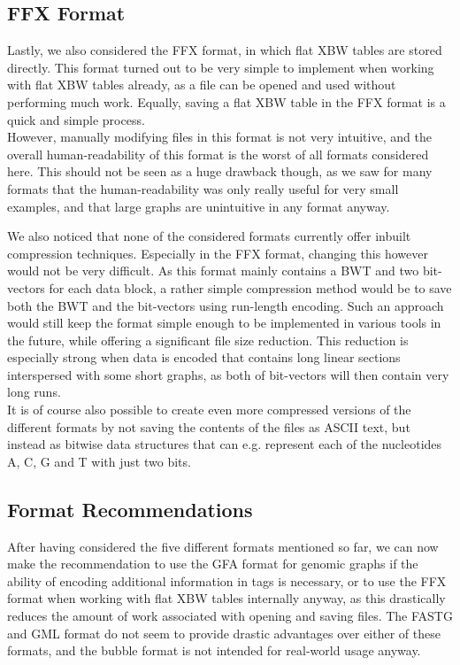 \documentclass[a4paper,12pt,twoside,BCOR=10mm]{scrbook}
\begin{document}
\subsection{FFX Format}

Lastly, we also considered the FFX format, in which flat XBW tables are stored directly. 
This format turned out to be very simple to implement when working with flat XBW tables already, 
as a file can be opened and used without performing much work. Equally, saving a flat XBW table 
in the FFX format is a quick and simple process. \\
However, manually modifying files in this format is not very intuitive, 
and the overall human-readability of this format is the worst of all formats considered here. 
This should not be seen as a huge drawback though, as we saw for many formats that the human-readability was 
only really useful for very small examples, and that large graphs are unintuitive in any format anyway.

We also noticed that none of the considered formats currently offer inbuilt compression techniques. 
Especially in the FFX format, changing this however would not be very difficult. 
As this format mainly contains a BWT and two bit-vectors for each data block, 
a rather simple compression method would be to save both the BWT and the bit-vectors 
using run-length encoding. 
Such an approach would still keep the format simple enough to be implemented in various 
tools in the future, while offering a significant file size reduction. 
This reduction is especially strong when data is encoded that contains long linear sections 
interspersed with some short graphs, as both of bit-vectors will then 
contain very long runs. \\
It is of course also possible to create even more compressed versions 
of the different formats by not saving the contents of the files as ASCII text, 
but instead as bitwise data structures that can e.g. represent each of the nucleotides A, C, G and T with 
just two bits.

\subsection{Format Recommendations}

After having considered the five different formats mentioned so far, 
we can now make the recommendation to use the GFA format for genomic graphs 
if the ability of encoding additional information in tags is necessary, 
or to use the FFX format when working with flat XBW tables internally anyway, 
as this drastically reduces the amount of work associated with opening and saving files. 
The FASTG and GML format do not seem to provide drastic advantages over either of these formats, 
and the bubble format is not intended for real-world usage anyway.
\end{document}
